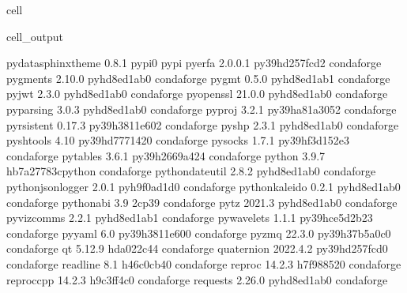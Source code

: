 \documentclass[letterpaper,table,10pt,english]{jupyterBook}
\begin{document}
\begin{sphinxuseclass}{cell}
\begin{sphinxVerbatimOutput}
\begin{sphinxuseclass}{cell_output}
\begin{sphinxVerbatim}[commandchars=\\\{\}]
pydata\PYGZhy{}sphinx\PYGZhy{}theme       0.8.1                    pypi\PYGZus{}0    pypi
pyerfa                    2.0.0.1          py39hd257fcd\PYGZus{}2    conda\PYGZhy{}forge
pygments                  2.10.0             pyhd8ed1ab\PYGZus{}0    conda\PYGZhy{}forge
pygmt                     0.5.0              pyhd8ed1ab\PYGZus{}1    conda\PYGZhy{}forge
pyjwt                     2.3.0              pyhd8ed1ab\PYGZus{}0    conda\PYGZhy{}forge
pyopenssl                 21.0.0             pyhd8ed1ab\PYGZus{}0    conda\PYGZhy{}forge
pyparsing                 3.0.3              pyhd8ed1ab\PYGZus{}0    conda\PYGZhy{}forge
pyproj                    3.2.1            py39ha81a305\PYGZus{}2    conda\PYGZhy{}forge
pyrsistent                0.17.3           py39h3811e60\PYGZus{}2    conda\PYGZhy{}forge
pyshp                     2.3.1              pyhd8ed1ab\PYGZus{}0    conda\PYGZhy{}forge
pyshtools                 4.10             py39hd777142\PYGZus{}0    conda\PYGZhy{}forge
pysocks                   1.7.1            py39hf3d152e\PYGZus{}3    conda\PYGZhy{}forge
pytables                  3.6.1            py39h2669a42\PYGZus{}4    conda\PYGZhy{}forge
python                    3.9.7           hb7a2778\PYGZus{}3\PYGZus{}cpython    conda\PYGZhy{}forge
python\PYGZhy{}dateutil           2.8.2              pyhd8ed1ab\PYGZus{}0    conda\PYGZhy{}forge
python\PYGZhy{}json\PYGZhy{}logger        2.0.1              pyh9f0ad1d\PYGZus{}0    conda\PYGZhy{}forge
python\PYGZhy{}kaleido            0.2.1              pyhd8ed1ab\PYGZus{}0    conda\PYGZhy{}forge
python\PYGZus{}abi                3.9                      2\PYGZus{}cp39    conda\PYGZhy{}forge
pytz                      2021.3             pyhd8ed1ab\PYGZus{}0    conda\PYGZhy{}forge
pyviz\PYGZus{}comms               2.2.1              pyhd8ed1ab\PYGZus{}1    conda\PYGZhy{}forge
pywavelets                1.1.1            py39hce5d2b2\PYGZus{}3    conda\PYGZhy{}forge
pyyaml                    6.0              py39h3811e60\PYGZus{}0    conda\PYGZhy{}forge
pyzmq                     22.3.0           py39h37b5a0c\PYGZus{}0    conda\PYGZhy{}forge
qt                        5.12.9               hda022c4\PYGZus{}4    conda\PYGZhy{}forge
quaternion                2022.4.2         py39hd257fcd\PYGZus{}0    conda\PYGZhy{}forge
readline                  8.1                  h46c0cb4\PYGZus{}0    conda\PYGZhy{}forge
reproc                    14.2.3               h7f98852\PYGZus{}0    conda\PYGZhy{}forge
reproc\PYGZhy{}cpp                14.2.3               h9c3ff4c\PYGZus{}0    conda\PYGZhy{}forge
requests                  2.26.0             pyhd8ed1ab\PYGZus{}0    conda\PYGZhy{}forge

\end{sphinxVerbatim}
\end{sphinxuseclass}
\end{sphinxVerbatimOutput}
\end{sphinxuseclass}
\end{document}
